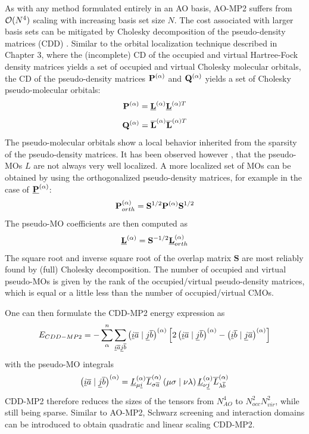 As with any method formulated entirely in an AO basis, AO-MP2 suffers from $\mathcal{O}(N^{4})$ scaling with increasing basis set size $N$. The cost associated with larger basis sets can be mitigated by Cholesky decomposition of the pseudo-density matrices (CDD) \cite{Zie2009}. Similar to the orbital localization technique described in Chapter 3, where the (incomplete) CD of the occupied and virtual Hartree-Fock density matrices yields a set of occupied and virtual Cholesky molecular orbitals, the CD of the pseudo-density matrices $\mathbf{P}^{(\alpha)}$ and $\mathbf{Q}^{(\alpha)}$ yields a set of Cholesky pseudo-molecular orbitals: 
\begin{equation}
\mathbf{P}^{(\alpha)} = \mathbf{\underline{L}}^{(\alpha)} \mathbf{\underline{L}}^{(\alpha)T}
\end{equation}
\begin{equation}
\mathbf{Q}^{(\alpha)} = \mathbf{\overline{L}}^{(\alpha)} \mathbf{\overline{L}}^{(\alpha)T}
\end{equation} 
\noindent The pseudo-molecular orbitals show a local behavior inherited from the sparsity of the pseudo-density matrices. It has been observed however \cite{Lue2017}, that the pseudo-MOs $L$ are not always very well localized. A more localized set of MOs can be obtained by using the orthogonalized pseudo-density matrices, for example in the case of $\mathbf{\underline{P}}^{(\alpha)}$:
\begin{equation}
\mathbf{P}^{(\alpha)}_{orth} = \mathbf{S}^{1/2} \mathbf{P}^{(\alpha)} \mathbf{S}^{1/2}
\end{equation}
\noindent The pseudo-MO coefficients are then computed as
\begin{equation}
\mathbf{\underline{L}}^{(\alpha)} = \mathbf{S}^{-1/2} \mathbf{\underline{L}}^{(\alpha)}_{orth}
\end{equation}
\noindent The square root and inverse square root of the overlap matrix $\mathbf{S}$ are most reliably found by (full) Cholesky decomposition. The number of occupied and virtual pseudo-MOs is given by the rank of the occupied/virtual pseudo-density matrices, which is equal or a little less than the number of occupied/virtual CMOs. 

One can then formulate the CDD-MP2 energy expression as
\begin{equation}
E_{CDD-MP2} = - \sum_{\alpha}^n \sum_{\underline{i}\overline{a}\underline{j}\overline{b}} \left( \underline{i}\overline{a} \mid \underline{j}\overline{b} \right)^{(\alpha)} \left [ 2\left( \underline{i}\overline{a} \mid \underline{j}\overline{b} \right)^{(\alpha)} -  \left( \underline{i}\overline{b} \mid \underline{j}\overline{a} \right)^{(\alpha)} \right]
\end{equation}
\noindent with the pseudo-MO integrals
\begin{equation}
\left( \underline{i}\overline{a} \mid \underline{j}\overline{b} \right)^{(\alpha)} = \underline{L}^{(\alpha)}_{\mu\underline{i}} \overline{L}^{(\alpha)}_{\sigma\overline{a}} \left( \mu\sigma \mid \nu\lambda \right) \underline{L}^{(\alpha)}_{\nu\underline{j}} \overline{L}^{(\alpha)}_{\lambda\overline{b}}
\end{equation}
\noindent CDD-MP2 therefore reduces the sizes of the tensors from $N^{4}_{AO}$ to $N_{occ}^2N_{vir}^2$, while still being sparse. Similar to AO-MP2, Schwarz screening and interaction domains can be introduced to obtain quadratic and linear scaling CDD-MP2.

